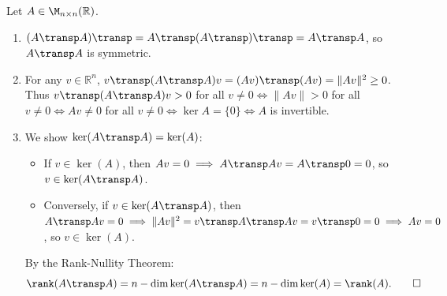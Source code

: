 \begin{exercisesolution}
\label{sol:gram_matrix_properties}
Let $A \in \M_{n \times n}(\mathbb{R})$.
\begin{enumerate}[label=\textbf{(\alph*)}]
    \item $(A\transp A)\transp = A\transp (A\transp)\transp = A\transp A$, so $A\transp A$ is symmetric.

    \item For any $v \in \mathbb{R}^n$, $v\transp (A\transp A) v = (Av)\transp (Av) = \|Av\|^2 \ge 0$.
    Thus $v\transp (A\transp A) v > 0$ for all $v \ne 0 \iff \|Av\| > 0$ for all $v \ne 0 \iff Av \ne 0$ for all $v \ne 0 \iff \ker A = \{0\} \iff A$ is invertible.

    \item We show $\ker(A\transp A) = \ker(A)$:
    \begin{itemize}
        \item If $v \in \ker(A)$, then $Av = 0 \implies A\transp A v = A\transp 0 = 0$, so $v \in \ker(A\transp A)$.
        \item Conversely, if $v \in \ker(A\transp A)$, then $A\transp A v = 0 \implies \|Av\|^2 = v\transp A\transp A v = v\transp 0 = 0 \implies Av = 0$, so $v \in \ker(A)$.
    \end{itemize}
    By the Rank-Nullity Theorem:
    \[
    \rank(A\transp A) = n - \dim\ker(A\transp A) = n - \dim\ker(A) = \rank(A). \qedhere
    \]
\end{enumerate}
\end{exercisesolution}

